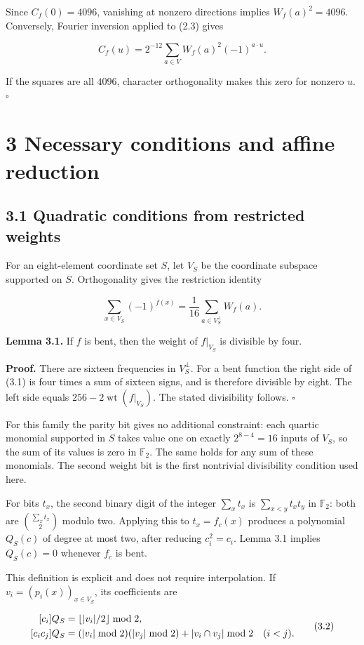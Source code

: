 \documentclass[pdflatex,sn-mathphys-num]{sn-jnl}
\begin{document}
Since $C_f(0)=4096$, vanishing at nonzero directions implies $W_f(a)^2=4096$. Conversely, Fourier inversion applied to (2.3) gives

\[
C_f(u)=2^{-12}\sum_{a\in V}W_f(a)^2(-1)^{a\cdot u}.
\]

If the squares are all $4096$, character orthogonality makes this zero for nonzero $u$. \hfill$\square$

\section*{3 Necessary conditions and affine reduction}

\subsection*{3.1 Quadratic conditions from restricted weights}

For an eight-element coordinate set $S$, let $V_S$ be the coordinate subspace supported on $S$. Orthogonality gives the restriction identity

\[
\sum_{x\in V_S}(-1)^{f(x)}=\frac1{16}\sum_{a\in V_S^\perp}W_f(a). \tag{3.1}
\]

\textbf{Lemma 3.1.} If $f$ is bent, then the weight of $f|_{V_S}$ is divisible by four.

\textbf{Proof.} There are sixteen frequencies in $V_S^\perp$. For a bent function the right side of (3.1) is four times a sum of sixteen signs, and is therefore divisible by eight. The left side equals $256-2\operatorname{wt}(f|_{V_S})$. The stated divisibility follows. \hfill$\square$

For this family the parity bit gives no additional constraint: each quartic monomial supported in $S$ takes value one on exactly $2^{8-4}=16$ inputs of $V_S$, so the sum of its values is zero in $\mathbb F_2$. The same holds for any sum of these monomials. The second weight bit is the first nontrivial divisibility condition used here.

For bits $t_x$, the second binary digit of the integer $\sum_x t_x$ is
$\sum_{x<y}t_xt_y$ in $\mathbb F_2$: both are $\binom{\sum_x t_x}{2}$ modulo two. Applying this to $t_x=f_c(x)$ produces a polynomial $Q_S(c)$ of degree at most two, after reducing $c_i^2=c_i$. Lemma 3.1 implies $Q_S(c)=0$ whenever $f_c$ is bent.

This definition is explicit and does not require interpolation. If $v_i=(p_i(x))_{x\in V_S}$, its coefficients are

\[
\begin{aligned}\relax[c_i]Q_S&=\left\lfloor |v_i|/2\right\rfloor\bmod2,\\\relax[c_ic_j]Q_S&=(|v_i|\bmod2)(|v_j|\bmod2)+|v_i\cap v_j|\bmod2\quad(i<j).\end{aligned} \tag{3.2}
\]
\end{document}
